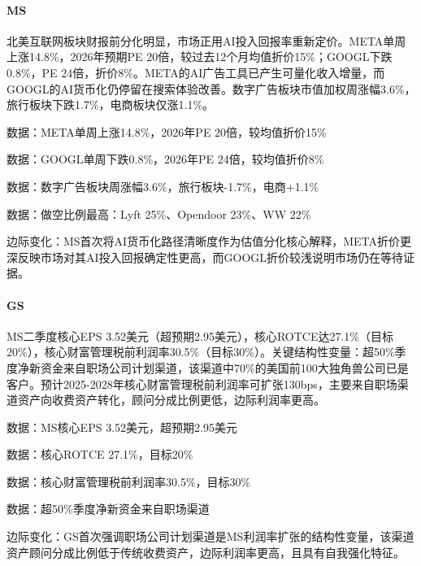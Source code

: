 \documentclass[11pt]{ctexart}
\begin{document}
\paragraph{MS} 北美互联网板块财报前分化明显，市场正用AI投入回报率重新定价。META单周上涨14.8\%，2026年预期PE 20倍，较过去12个月均值折价15\%；GOOGL下跌0.8\%，PE 24倍，折价8\%。META的AI广告工具已产生可量化收入增量，而GOOGL的AI货币化仍停留在搜索体验改善。数字广告板块市值加权周涨幅3.6\%，旅行板块下跌1.7\%，电商板块仅涨1.1\%。
{\small\color{refgray}数据：META单周上涨14.8\%，2026年PE 20倍，较均值折价15\%\par}
{\small\color{refgray}数据：GOOGL单周下跌0.8\%，2026年PE 24倍，较均值折价8\%\par}
{\small\color{refgray}数据：数字广告板块周涨幅3.6\%，旅行板块-1.7\%，电商+1.1\%\par}
{\small\color{refgray}数据：做空比例最高：Lyft 25\%、Opendoor 23\%、WW 22\%\par}
{\small\color{refgray}边际变化：MS首次将AI货币化路径清晰度作为估值分化核心解释，META折价更深反映市场对其AI投入回报确定性更高，而GOOGL折价较浅说明市场仍在等待证据。\par}
\paragraph{GS} MS二季度核心EPS 3.52美元（超预期2.95美元），核心ROTCE达27.1\%（目标20\%），核心财富管理税前利润率30.5\%（目标30\%）。关键结构性变量：超50\%季度净新资金来自职场公司计划渠道，该渠道中70\%的美国前100大独角兽公司已是客户。预计2025-2028年核心财富管理税前利润率可扩张130bps，主要来自职场渠道资产向收费资产转化，顾问分成比例更低，边际利润率更高。
{\small\color{refgray}数据：MS核心EPS 3.52美元，超预期2.95美元\par}
{\small\color{refgray}数据：核心ROTCE 27.1\%，目标20\%\par}
{\small\color{refgray}数据：核心财富管理税前利润率30.5\%，目标30\%\par}
{\small\color{refgray}数据：超50\%季度净新资金来自职场渠道\par}
{\small\color{refgray}边际变化：GS首次强调职场公司计划渠道是MS利润率扩张的结构性变量，该渠道资产顾问分成比例低于传统收费资产，边际利润率更高，且具有自我强化特征。\par}
\end{document}
